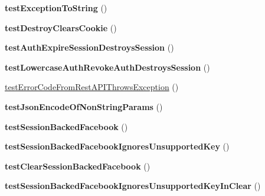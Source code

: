 \begin{DoxyCompactItemize}
\item 
\hypertarget{classPHPSDKTestCase_a56781c2c8acb5e72c05d2ec853cedb7d}{{\bfseries test\-Exception\-To\-String} ()}\label{classPHPSDKTestCase_a56781c2c8acb5e72c05d2ec853cedb7d}

\item 
\hypertarget{classPHPSDKTestCase_a8a5cb65f454856e869a1be7e5aa0ebd5}{{\bfseries test\-Destroy\-Clears\-Cookie} ()}\label{classPHPSDKTestCase_a8a5cb65f454856e869a1be7e5aa0ebd5}

\item 
\hypertarget{classPHPSDKTestCase_a79f1af35a5d18e69c7441b930eb00a82}{{\bfseries test\-Auth\-Expire\-Session\-Destroys\-Session} ()}\label{classPHPSDKTestCase_a79f1af35a5d18e69c7441b930eb00a82}

\item 
\hypertarget{classPHPSDKTestCase_a7337af28888559210ee37a3e5aa9d5d4}{{\bfseries test\-Lowercase\-Auth\-Revoke\-Auth\-Destroys\-Session} ()}\label{classPHPSDKTestCase_a7337af28888559210ee37a3e5aa9d5d4}

\item 
\hyperlink{classPHPSDKTestCase_afbc098e9b46c6410baa1569ef0a90741}{test\-Error\-Code\-From\-Rest\-A\-P\-I\-Throws\-Exception} ()
\item 
\hypertarget{classPHPSDKTestCase_ab5c12a7c090049aac1ddb097e334ae67}{{\bfseries test\-Json\-Encode\-Of\-Non\-String\-Params} ()}\label{classPHPSDKTestCase_ab5c12a7c090049aac1ddb097e334ae67}

\item 
\hypertarget{classPHPSDKTestCase_a95838a17975a0c6c1135f01b85c8acbd}{{\bfseries test\-Session\-Backed\-Facebook} ()}\label{classPHPSDKTestCase_a95838a17975a0c6c1135f01b85c8acbd}

\item 
\hypertarget{classPHPSDKTestCase_aaab4a7a32855e5b053d284ee7fa71a0f}{{\bfseries test\-Session\-Backed\-Facebook\-Ignores\-Unsupported\-Key} ()}\label{classPHPSDKTestCase_aaab4a7a32855e5b053d284ee7fa71a0f}

\item 
\hypertarget{classPHPSDKTestCase_a77fdd3ed08d0a306518d1212739ce643}{{\bfseries test\-Clear\-Session\-Backed\-Facebook} ()}\label{classPHPSDKTestCase_a77fdd3ed08d0a306518d1212739ce643}

\item 
\hypertarget{classPHPSDKTestCase_a8669007a82797e538d71285062ef922f}{{\bfseries test\-Session\-Backed\-Facebook\-Ignores\-Unsupported\-Key\-In\-Clear} ()}\label{classPHPSDKTestCase_a8669007a82797e538d71285062ef922f}


\end{DoxyCompactItemize}
